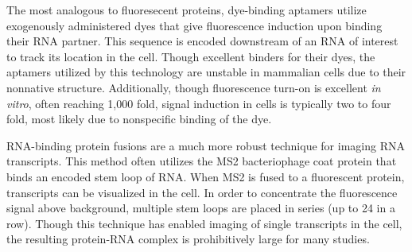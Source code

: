 The most analogous to fluoresecent proteins, dye-binding aptamers utilize exogenously administered dyes that give fluorescence induction upon binding their RNA partner.\cite{PaigeRNAMimicsGreen2011,FilonovBroccoliRapidSelection2014,AutourFluorogenicRNAMango2018,DolgosheinaRNAMangoAptamerFluorophore2014} This sequence is encoded downstream of an RNA of interest to track its location in the cell. Though excellent binders for their dyes, the aptamers utilized by this technology are unstable in mammalian cells due to their nonnative structure.\cite{EtzelSyntheticRiboswitchesPlug2017} Additionally, though fluorescence turn-on is excellent \textit{in vitro}, often reaching 1,000 fold, signal induction in cells is typically two to four fold, most likely due to nonspecific binding of the dye.

RNA-binding protein fusions are a much more robust technique for imaging RNA transcripts.\cite{FuscoSinglemRNAMolecules2003} This method often utilizes the MS2 bacteriophage coat protein that binds an encoded stem loop of RNA. When MS2 is fused to a fluorescent protein, transcripts can be visualized in the cell. In order to concentrate the fluorescence signal above background, multiple stem loops are placed in series (up to 24 in a row). Though this technique has enabled imaging of single transcripts in the cell,\cite{MorisakiRealtimequantificationsingle2016,FuscoSinglemRNAMolecules2003} the resulting protein-RNA complex is prohibitively large for many studies.


